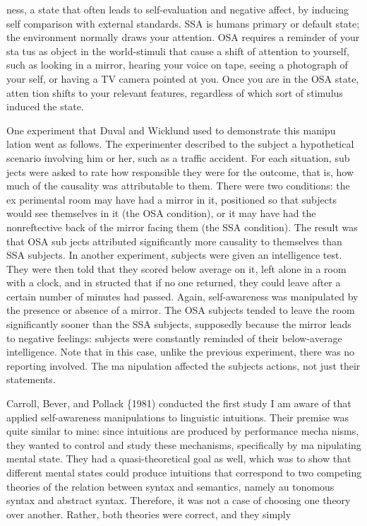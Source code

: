 \clearpage\setcounter{page}{1}\begin{styleTextbody}
ness, a state that often leads to self-evaluation and negative affect, by inducing self\- comparison with external standards. SSA is humans{\textquotesingle} primary or default state; the environment normally draws your attention. OSA requires a reminder of your sta\- tus as object in the world-stimuli that cause a shift of attention to yourself, such as looking in a mirror, hearing your voice on tape, seeing a photograph of your\- self, or having a TV camera pointed at you. Once you are in the OSA state, atten\- tion shifts to your relevant features, regardless of which sort of stimulus induced the state.
\end{styleTextbody}


\begin{styleTextbody}
One experiment that Duval and Wicklund used to demonstrate this manipu\- lation went as follows. The experimenter described to the subject a hypothetical scenario involving him or her, such as a traffic accident. For each situation, sub\- jects were asked to rate how responsible they were for the outcome, that is, how much of the causality was attributable to them. There were two conditions: the ex\- perimental room may have had a mirror in it, positioned so that subjects would see themselves in it (the OSA condition), or it may have had the nonreftective back of the mirror facing them (the SSA condition). The result was that OSA sub\- jects attributed significantly more causality to themselves than SSA subjects. In another experiment, subjects were given an intelligence test. They were then told that they scored below average on it, left alone in a room with a clock, and in\- structed that if no one returned, they could leave after a certain number of minutes had passed. Again, self-awareness was manipulated by the presence or absence of a mirror. The OSA subjects tended to leave the room significantly sooner than the SSA subjects, supposedly because the mirror leads to negative feelings: subjects were constantly reminded of their {\textquotedbl}below-average intelligence.{\textquotedbl} Note that in this case, unlike the previous experiment, there was no reporting involved. The ma\- nipulation affected the subjects{\textquotesingle} actions, not just their statements.
\end{styleTextbody}


\begin{styleTextbody}
Carroll, Bever, and Pollack \{1981) conducted the first study I am aware of that applied self-awareness manipulations to linguistic intuitions. Their premise was quite similar to mine: since intuitions are produced by performance mecha\- nisms, they wanted to control and study these mechanisms, specifically by ma\- nipulating mental state. They had a quasi-theoretical goal as well, which was to show that different mental states could produce intuitions that correspond to two competing theories of the relation between syntax and semantics, namely au\- tonomous syntax and abstract syntax. Therefore, it was not a case of choosing one theory over another. Rather, both theories were correct, and they simply
\end{styleTextbody}


